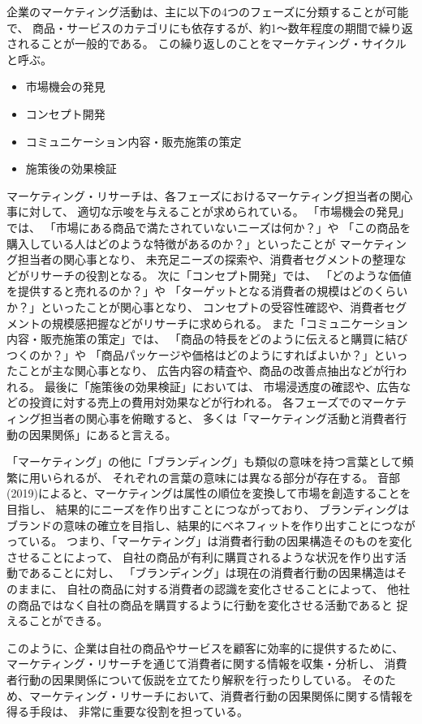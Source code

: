 企業のマーケティング活動は、主に以下の4つのフェーズに分類することが可能で、
商品・サービスのカテゴリにも依存するが、約1〜数年程度の期間で繰り返されることが一般的である。
この繰り返しのことをマーケティング・サイクルと呼ぶ。
\begin{itemize}
  \item 市場機会の発見
  \item コンセプト開発
  \item コミュニケーション内容・販売施策の策定
  \item 施策後の効果検証
\end{itemize}
マーケティング・リサーチは、各フェーズにおけるマーケティング担当者の関心事に対して、
適切な示唆を与えることが求められている。
「市場機会の発見」では、
「市場にある商品で満たされていないニーズは何か？」や
「この商品を購入している人はどのような特徴があるのか？」といったことが
マーケティング担当者の関心事となり、
未充足ニーズの探索や、消費者セグメントの整理などがリサーチの役割となる。
次に「コンセプト開発」では、
「どのような価値を提供すると売れるのか？」や
「ターゲットとなる消費者の規模はどのくらいか？」といったことが関心事となり、
コンセプトの受容性確認や、消費者セグメントの規模感把握などがリサーチに求められる。
また「コミュニケーション内容・販売施策の策定」では、
「商品の特長をどのように伝えると購買に結びつくのか？」や
「商品パッケージや価格はどのようにすればよいか？」といったことが主な関心事となり、
広告内容の精査や、商品の改善点抽出などが行われる。
最後に「施策後の効果検証」においては、
市場浸透度の確認や、広告などの投資に対する売上の費用対効果などが行われる。
各フェーズでのマーケティング担当者の関心事を俯瞰すると、
多くは「マーケティング活動と消費者行動の因果関係」にあると言える。

「マーケティング」の他に「ブランディング」も類似の意味を持つ言葉として頻繁に用いられるが、
それぞれの言葉の意味には異なる部分が存在する。
音部(2019)\cite{2019-eb}によると、マーケティングは属性の順位を変換して市場を創造することを目指し、
結果的にニーズを作り出すことにつながっており、
ブランディングはブランドの意味の確立を目指し、結果的にベネフィットを作り出すことにつながっている。
つまり、「マーケティング」は消費者行動の因果構造そのものを変化させることによって、
自社の商品が有利に購買されるような状況を作り出す活動であることに対し、
「ブランディング」は現在の消費者行動の因果構造はそのままに、
自社の商品に対する消費者の認識を変化させることによって、
他社の商品ではなく自社の商品を購買するように行動を変化させる活動であると
捉えることができる。

このように、企業は自社の商品やサービスを顧客に効率的に提供するために、
マーケティング・リサーチを通じて消費者に関する情報を収集・分析し、
消費者行動の因果関係について仮説を立てたり解釈を行ったりしている。
そのため、マーケティング・リサーチにおいて、消費者行動の因果関係に関する情報を得る手段は、
非常に重要な役割を担っている。
